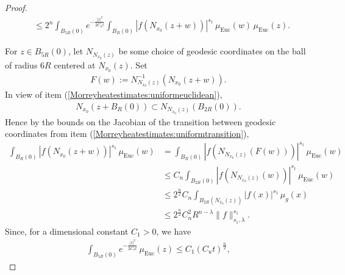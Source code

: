 \documentclass[12pt]{amsart}
\renewcommand{\1}{{\mathbf 1}}
\theoremstyle{others}
\numberwithin{equation}{section}
\begin{document}
\begin{proof}
\begin{align*}
       &\leq 2^n  \int_{B_{5R}(0)} e^{-\frac{|z|^2}{2C_ut}} \int_{B_R(0)}|f(N_{x_0}(z+w))|^{s_1} \, \mu_{\text{Euc}}(w) \, \mu_{\text{Euc}}(z).
   \end{align*} 

   For \(z \in B_{5R}(0)\), let \(N_{N_{x_0}(z)}\) be some choice of geodesic coordinates on the ball of radius \(6R\) centered at \(N_{x_0}(z)\). Set
   \begin{align*}
       F(w) := N_{N_{x_0}(z)}^{-1}(N_{x_0}(z+w)).
   \end{align*} In view of item (\ref{Morreyheatestimates:uniformeuclidean}), 
   \begin{align*}
       N_{x_0}(z + B_R(0)) \subset N_{N_{x_0}(z)}(B_{2R}(0)).
   \end{align*} Hence by the bounds on the Jacobian of the transition between geodesic coordinates from item (\ref{Morreyheatestimates:uniformtransition}),
   \begin{align*}
       \int_{B_R(0)} |f(N_{x_0}(z+w))|^{s_1} \, \mu_{\text{Euc}}(w) &= \int_{B_R(0)} |f(N_{N_{x_0}(z)}(F(w)))|^{s_1} \, \mu_{\text{Euc}}(w) \\
       &\leq C_n \int_{B_{2R}(0)} |f(N_{N_{x_0}(z)}(w))|^{s_1} \, \mu_{\text{Euc}}(w) \\
       &\leq 2^{\frac{n}{2}} C_n \int_{B_{2R}(N_{x_0}(z))} |f(x)|^{s_1} \, \mu_g(x) \\
       &\leq 2^{\frac{n}{2}} C_n^2 R^{n-\lambda} \|f\|_{s_1, \lambda}^{s_1}.
   \end{align*} Since, for a dimensional constant \(C_1 > 0\), we have
   \begin{align*}
       \int_{B_{5R}(0)} e^{-\frac{|z|^2}{2C_u t}} \, \mu_{\text{Euc}}(z) \leq C_1 (C_u t)^{\frac{n}{2}},
   \end{align*}

\end{proof}
\end{document}
